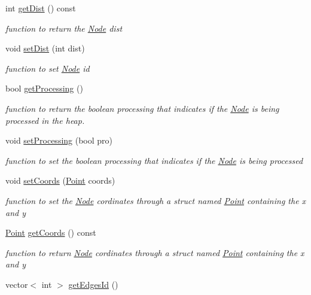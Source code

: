 \begin{DoxyCompactItemize}
int \hyperlink{class_node_a0b0c45c65266a320dc0c1c24a226fc12}{get\+Dist} () const
\begin{DoxyCompactList}\small\item\em function to return the \hyperlink{class_node}{Node} dist \end{DoxyCompactList}\item 
void \hyperlink{class_node_a4bfac5a526a40c0d41429892760722c6}{set\+Dist} (int dist)
\begin{DoxyCompactList}\small\item\em function to set \hyperlink{class_node}{Node} id \end{DoxyCompactList}\item 
bool \hyperlink{class_node_a411b7225b6f0b1a7d0ffe02196dedb86}{get\+Processing} ()
\begin{DoxyCompactList}\small\item\em function to return the boolean processing that indicates if the \hyperlink{class_node}{Node} is being processed in the heap. \end{DoxyCompactList}\item 
void \hyperlink{class_node_afe1cac7d39ccadd907caa67013891fb6}{set\+Processing} (bool pro)
\begin{DoxyCompactList}\small\item\em function to set the boolean processing that indicates if the \hyperlink{class_node}{Node} is being processed \end{DoxyCompactList}\item 
void \hyperlink{class_node_af5baac137a6dbe502c671c6fef993223}{set\+Coords} (\hyperlink{struct_point}{Point} coords)
\begin{DoxyCompactList}\small\item\em function to set the \hyperlink{class_node}{Node} cordinates through a struct named \hyperlink{struct_point}{Point} containing the x and y \end{DoxyCompactList}\item 
\hyperlink{struct_point}{Point} \hyperlink{class_node_a1911ad83f5ebe9ba596e70d6901bb7b5}{get\+Coords} () const
\begin{DoxyCompactList}\small\item\em function to return \hyperlink{class_node}{Node} cordinates through a struct named \hyperlink{struct_point}{Point} containing the x and y \end{DoxyCompactList}\item 
vector$<$ int $>$ \hyperlink{class_node_a9aadeebc828eedfaf8b2a9c2e6fb9e15}{get\+Edges\+Id} ()

\end{DoxyCompactItemize}
